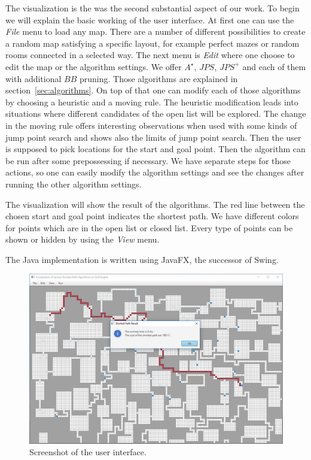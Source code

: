 \documentclass{article}
\begin{document}
    The visualization is the was the second substantial aspect of our work. To begin we will explain the basic working of the user interface. At first one can use the \textit{File} menu to load any map. There are a number of different possibilities to create a random map satisfying a specific layout, for example perfect mazes or random rooms connected in a selected way. The next menu is \textit{Edit} where one choose to edit the map or the algorithm settings. We offer $A^\star$, $JPS$, $JPS^+$ and each of them with additional $BB$ pruning. Those algorithms are explained in section~\ref{sec:algorithms}. On top of that one can modify each of those algorithms by choosing a heuristic and a moving rule. The heuristic modification leads into situations where different candidates of the open list will be explored. The change in the moving rule offers interesting observations when used with some kinds of jump point search and shows also the limits of jump point search. Then the user is supposed to pick locations for the start and goal point. Then the algorithm can be run after some prepossessing if necessary. We have separate steps for those actions, so one can easily modify the algorithm settings and see the changes after running the other algorithm settings.

    The visualization will show the result of the algorithms. The red line between the chosen start and goal point indicates the shortest path. We have different colors for points which are in the open list or closed list. Every type of points can be shown or hidden by using the \textit{View} menu.

    The Java implementation is written using JavaFX, the successor of Swing.

    \begin{figure}[!htb]
        \centering
        \includegraphics[width=\textwidth]{figures/javafx.png}
        \caption{Screenshot of the user interface.}
        \label{fig:javafx}
    \end{figure}
\end{document}
